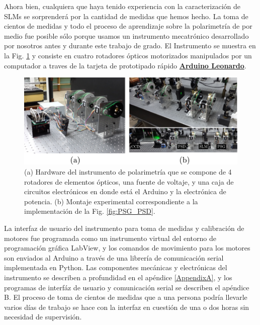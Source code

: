 Ahora bien, cualquiera que haya tenido experiencia con la
caracterización de SLMs se sorprenderá por la cantidad de medidas que
hemos hecho. La toma de cientos de medidas y todo el proceso de
aprendizaje sobre la polarimetría de por medio fue posible sólo
porque usamos un instrumento mecatrónico desarrollado por nosotros
antes y durante este trabajo de grado. El Instrumento se muestra en la
Fig. \ref{fig:montaje_real_polarimetro} y consiste en
cuatro rotadores ópticos motorizados manipulados por un computador a
traves de la tarjeta de prototipado rápido
\href{http://www.arduino.cc/en/Main/ArduinoBoardLeonardo}{\bf{Arduino Leonardo}}. 
\begin{figure}[h!]
\centering
\includegraphics[scale=.96]{montaje_real_polarimetro.pdf}
\caption[Hardware del instrumento de polarimetría y montaje
experimental ]{(a) Hardware del instrumento de polarimetría que se
  compone de 4 rotadores de elementos ópticos, una fuente de voltaje,
  y una caja de circuitos electrónicos en donde está el Arduino y la
  electrónica de potencia. (b) Montaje experimental correspondiente a
  la implementación de la Fig. \ref{fig:PSG_PSD}. }
\label{fig:montaje_real_polarimetro}
\end{figure}
 La interfaz de usuario del instrumento para toma de medidas y
calibración de motores fue programada como un
instrumento virtual del entorno de programación gráfica LabView, y los
comandos de movimiento para los motores son enviados al Arduino a
través de una librería de comunicación serial implementada en Python.
Las componentes mecánicas y electrónicas del instrumento se describen a profundidad en el
apéndice \ref{AppendixA}, y los programas de interfáz de usuario y
comunicación serial se describen el apéndice B.
El proceso de toma de cientos de medidas que a una persona podría llevarle varios
días de trabajo se hace con la interfaz en cuestión de una o dos horas
sin necesidad de supervisión.    

